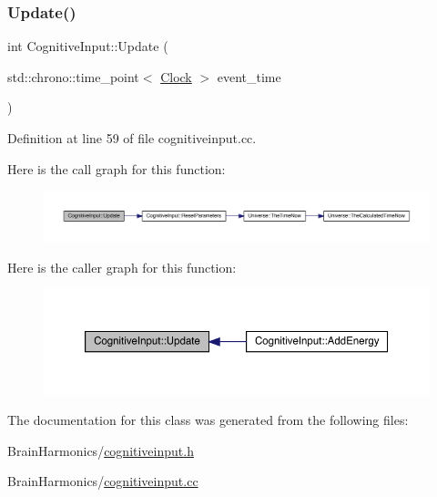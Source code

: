 \mbox{\label{class_cognitive_input_a93bd9d88194a545c9a85512edcbb6044}} 
\subsubsection{\texorpdfstring{Update()}{Update()}}
{\footnotesize\ttfamily int Cognitive\+Input\+::\+Update (\begin{DoxyParamCaption}\item[{std\+::chrono\+::time\+\_\+point$<$ \hyperlink{universe_8h_a0ef8d951d1ca5ab3cfaf7ab4c7a6fd80}{Clock} $>$}]{event\+\_\+time }\end{DoxyParamCaption})}



Definition at line 59 of file cognitiveinput.\+cc.

Here is the call graph for this function\+:
\nopagebreak
\begin{figure}[H]
\begin{center}
\leavevmode
\includegraphics[width=350pt]{class_cognitive_input_a93bd9d88194a545c9a85512edcbb6044_cgraph}
\end{center}
\end{figure}
Here is the caller graph for this function\+:
\nopagebreak
\begin{figure}[H]
\begin{center}
\leavevmode
\includegraphics[width=350pt]{class_cognitive_input_a93bd9d88194a545c9a85512edcbb6044_icgraph}
\end{center}
\end{figure}


The documentation for this class was generated from the following files\+:\begin{DoxyCompactItemize}
\item 
Brain\+Harmonics/\hyperlink{cognitiveinput_8h}{cognitiveinput.\+h}\item 
Brain\+Harmonics/\hyperlink{cognitiveinput_8cc}{cognitiveinput.\+cc}\end{DoxyCompactItemize}
